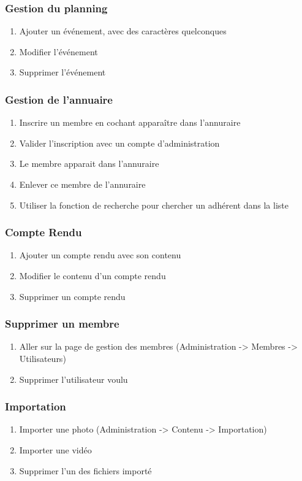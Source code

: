 \documentclass[11pt]{report}
\begin{document}
\subsubsection*{Gestion du planning}
\begin{enumerate}
\item Ajouter un événement, avec des caractères quelconques
\item Modifier l’événement
\item Supprimer l’événement
\end{enumerate}
\subsubsection*{Gestion de l'annuaire}
\begin{enumerate}
\item Inscrire un membre en cochant \og apparaître dans l'annuraire \fg{}
\item Valider l'inscription avec un compte d'administration
\item Le membre apparait dans l'annuraire
\item Enlever ce membre de l'annuraire
\item Utiliser la fonction de recherche pour chercher un adhérent dans la liste
\end{enumerate}
\subsubsection*{Compte Rendu}
\begin{enumerate}
\item Ajouter un compte rendu avec son contenu
\item Modifier le contenu d’un compte rendu
\item Supprimer un compte rendu
\end{enumerate}
\subsubsection*{Supprimer un membre}
\begin{enumerate}
 \item Aller sur la page de gestion des membres (Administration -> Membres -> Utilisateurs)
 \item Supprimer l'utilisateur voulu
\end{enumerate}

\subsubsection*{Importation}
\begin{enumerate}
 \item Importer une photo (Administration -> Contenu -> Importation)
 \item Importer une vidéo
 \item Supprimer l'un des fichiers importé
\end{enumerate}
\end{document}
